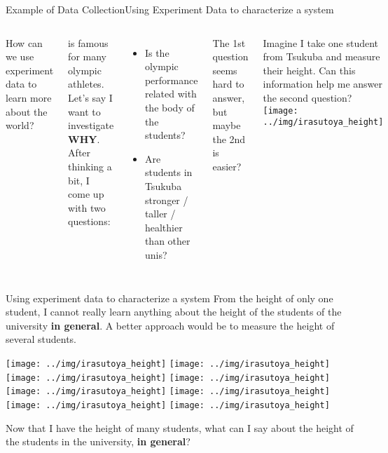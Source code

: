 \begin{frame}{Example of Data Collection}{Using Experiment Data to characterize a system}
  \begin{columns}
    How can we use experiment data to learn more about the world?\bigskip

     is famous for many olympic athletes. Let's say
    I want to investigate {\bf WHY}. After thinking a bit, I come up with two questions:
    \begin{itemize}
      \item Is the olympic performance related with the body of the students?
      \item Are students in Tsukuba stronger / taller / healthier than other unis?
    \end{itemize}\bigskip

    The 1st question seems hard to answer, but maybe the 2nd is easier?\bigskip

    Imagine I take one student from Tsukuba and measure their height.
    Can this information help me answer the second question?
    \texttt{[image: ../img/irasutoya\_height]}
  \end{columns}
\end{frame}

\begin{frame}{Using experiment data to characterize a system}
  From the height of only one student, I cannot really learn anything about
  the height of the students of the university {\bf in general}.
  A better approach would be to measure the height of several students.\bigskip

  \begin{center}
    \texttt{[image: ../img/irasutoya\_height]}
    \texttt{[image: ../img/irasutoya\_height]}
    \texttt{[image: ../img/irasutoya\_height]}
    \texttt{[image: ../img/irasutoya\_height]}
    \texttt{[image: ../img/irasutoya\_height]}
    \texttt{[image: ../img/irasutoya\_height]}
    \texttt{[image: ../img/irasutoya\_height]}
    \texttt{[image: ../img/irasutoya\_height]}
  \end{center}
  \bigskip

  Now that I have the height of many students, what can I say about the height
  of the students in the university, {\bf in general}?
\end{frame}

